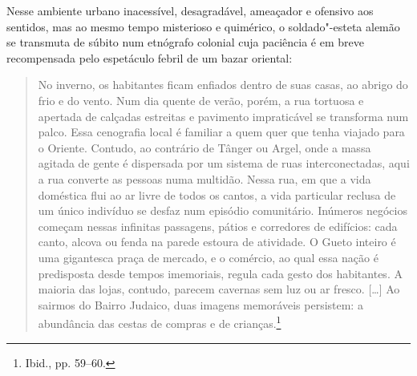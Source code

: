 Nesse ambiente urbano inacessível, desagradável, ameaçador e ofensivo
aos sentidos, mas ao mesmo tempo misterioso e quimérico, o
soldado"-esteta alemão se transmuta de súbito num etnógrafo colonial cuja
paciência é em breve recompensada pelo espetáculo febril de um bazar
oriental:

\begin{quote}
No inverno, os habitantes ficam enfiados dentro de suas casas, ao abrigo
do frio e do vento. Num dia quente de verão, porém, a rua tortuosa e
apertada de calçadas estreitas e pavimento impraticável se transforma
num palco. Essa cenografia local é familiar a quem quer que tenha
viajado para o Oriente. Contudo, ao contrário de Tânger ou Argel, onde a
massa agitada de gente é dispersada por um sistema de ruas
interconectadas, aqui a rua converte as pessoas numa multidão. Nessa
rua, em que a vida doméstica flui ao ar livre de todos os cantos, a vida
particular reclusa de um único indivíduo se desfaz num episódio
comunitário. Inúmeros negócios começam nessas infinitas passagens,
pátios e corredores de edifícios: cada canto, alcova ou fenda na parede
estoura de atividade. O Gueto inteiro é uma gigantesca praça de mercado,
e o comércio, ao qual essa nação é predisposta desde tempos imemoriais,
regula cada gesto dos habitantes. A maioria das lojas, contudo, parecem
cavernas sem luz ou ar fresco. [\ldots{}] Ao sairmos do Bairro Judaico,
duas imagens memoráveis persistem: a abundância das cestas de compras e
de crianças.\footnote{Ibid., pp. 59--60.}
\end{quote}

